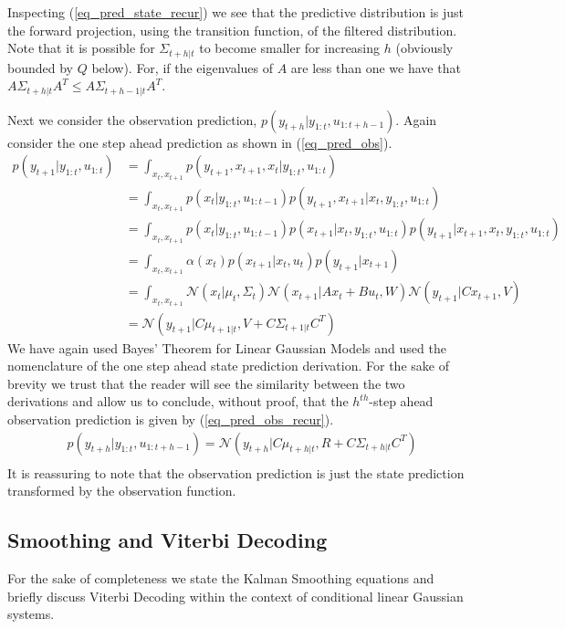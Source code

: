 \documentclass[../masters.tex]{subfiles}
\begin{document}
Inspecting (\ref{eq_pred_state_recur}) we see that the predictive distribution is just the forward projection, using the transition function, of the filtered distribution. Note that it is possible for $\Sigma_{t+h|t}$ to become smaller for increasing $h$ (obviously bounded by $Q$ below). For, if the eigenvalues of $A$ are less than one we have that $A\Sigma_{t+h|t}A^T \leq A\Sigma_{t+h-1|t}A^T$.

Next we consider the observation prediction, $p(y_{t+h}|y_{1:t}, u_{1:t+h-1})$. Again consider the one step ahead prediction as shown in (\ref{eq_pred_obs}).
\begin{equation}
\begin{aligned}
p(y_{t+1}|y_{1:t}, u_{1:t}) &= \int_{x_t, x_{t+1}} p(y_{t+1},x_{t+1},x_t|y_{1:t}, u_{1:t}) \\
&= \int_{x_t, x_{t+1}} p(x_t|y_{1:t}, u_{1:t-1})p(y_{t+1},x_{t+1}|x_t, y_{1:t}, u_{1:t}) \\
&= \int_{x_t, x_{t+1}} p(x_t|y_{1:t}, u_{1:t-1}) p(x_{t+1}|x_t, y_{1:t}, u_{1:t})p(y_{t+1}|x_{t+1}, x_t, y_{1:t}, u_{1:t}) \\
&= \int_{x_t, x_{t+1}} \alpha(x_t) p(x_{t+1}|x_t, u_{t}) p(y_{t+1}|x_{t+1}) \\
&= \int_{x_t, x_{t+1}} \mathcal{N}(x_t|\mu_t,\Sigma_t) \mathcal{N}(x_{t+1}|Ax_t+Bu_t, W) \mathcal{N}(y_{t+1}|Cx_{t+1}, V) \\
&= \mathcal{N}(y_{t+1}|C\mu_{t+1|t}, V+C\Sigma_{t+1|t}C^T)
\end{aligned}
\label{eq_pred_obs}
\end{equation}
We have again used Bayes' Theorem for Linear Gaussian Models and used the nomenclature of the one step ahead state prediction derivation. For the sake of brevity we trust that the reader will see the similarity between the two derivations and allow us to conclude, without proof, that the $h^{th}$-step ahead observation prediction is given by (\ref{eq_pred_obs_recur}).
\begin{equation}
\begin{aligned}
&p(y_{t+h}|y_{1:t}, u_{1:t+h-1}) = \mathcal{N}(y_{t+h}|C\mu_{t+h|t}, R+C\Sigma_{t+h|t}C^T) \\
\end{aligned}
\label{eq_pred_obs_recur}
\end{equation}
It is reassuring to note that the observation prediction is just the state prediction transformed by the observation function.

\subsection{Smoothing and Viterbi Decoding}
For the sake of completeness we state the Kalman Smoothing equations and briefly discuss Viterbi Decoding within the context of conditional linear Gaussian systems. 
\end{document}
